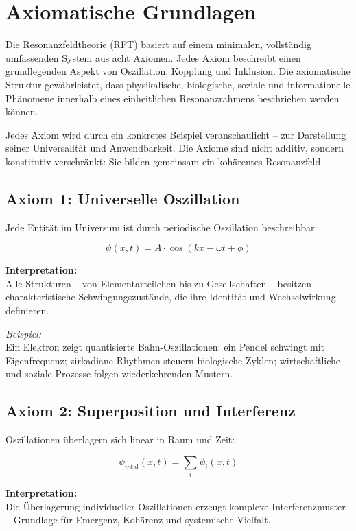 \documentclass[12pt]{iopart}
\providecommand{\text}[1]{\mbox{#1}}
\begin{document}
\section{Axiomatische Grundlagen}

Die Resonanzfeldtheorie (RFT) basiert auf einem minimalen, vollständig umfassenden System aus acht Axiomen. Jedes Axiom beschreibt einen grundlegenden Aspekt von Oszillation, Kopplung und Inklusion. Die axiomatische Struktur gewährleistet, dass physikalische, biologische, soziale und informationelle Phänomene innerhalb eines einheitlichen Resonanzrahmens beschrieben werden können.

Jedes Axiom wird durch ein konkretes Beispiel veranschaulicht – zur Darstellung seiner Universalität und Anwendbarkeit. Die Axiome sind nicht additiv, sondern konstitutiv verschränkt: Sie bilden gemeinsam ein kohärentes Resonanzfeld.

\subsection{Axiom 1: Universelle Oszillation}

Jede Entität im Universum ist durch periodische Oszillation beschreibbar:

$$
\psi(x, t) = A \cdot \cos(kx - \omega t + \phi)
$$

\textbf{Interpretation:}\\
Alle Strukturen – von Elementarteilchen bis zu Gesellschaften – besitzen charakteristische Schwingungszustände, die ihre Identität und Wechselwirkung definieren.

\textit{Beispiel:}\\
Ein Elektron zeigt quantisierte Bahn-Oszillationen; ein Pendel schwingt mit Eigenfrequenz; zirkadiane Rhythmen steuern biologische Zyklen; wirtschaftliche und soziale Prozesse folgen wiederkehrenden Mustern.

\newpage

\subsection{Axiom 2: Superposition und Interferenz}

Oszillationen überlagern sich linear in Raum und Zeit:

$$
\psi_{\text{total}}(x, t) = \sum_i \psi_i(x, t)
$$

\textbf{Interpretation:}\\
Die Überlagerung individueller Oszillationen erzeugt komplexe Interferenzmuster – Grundlage für Emergenz, Kohärenz und systemische Vielfalt.
\end{document}
